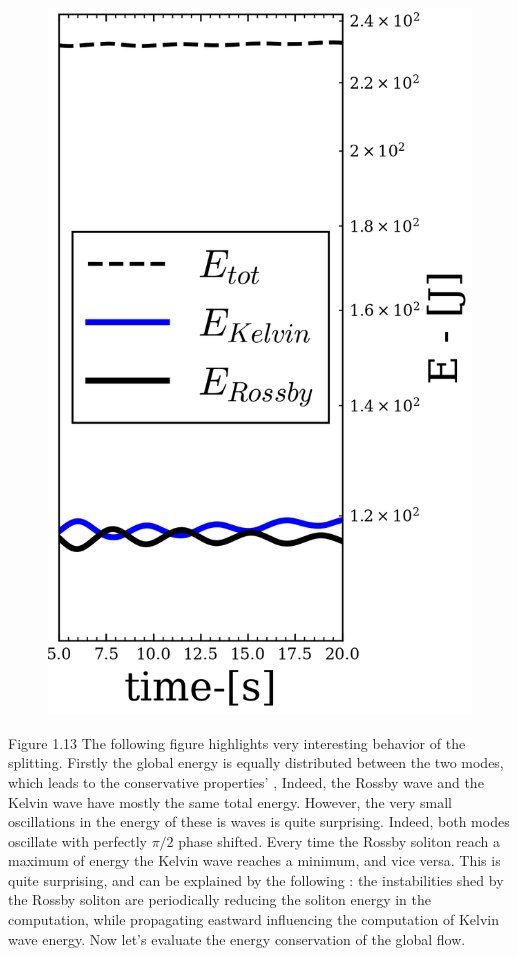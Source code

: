 \documentclass[11pt,a4paper]{report}
\begin{document}
\begin{multicols}{2}
    \begin{figure}
        \hspace*{-0.2cm}\includegraphics[width=1.2\linewidth]{./figure/energy_repartition.png}
    \end{figure}
    Figure 1.13 The following figure highlights very interesting behavior of the splitting. Firstly the global energy is equally distributed between the two modes, which leads to the conservative properties' , 
    Indeed, the Rossby wave and the Kelvin wave have mostly the same total energy. However, the very small oscillations in the energy of these is waves is quite surprising.
    Indeed, both modes oscillate with perfectly $\pi / 2$ phase shifted. Every time the Rossby soliton reach a maximum of energy the Kelvin wave reaches a minimum, and vice versa. This is quite surprising, and can be explained by the following : the instabilities shed by the Rossby soliton are periodically reducing the soliton energy in the computation, while propagating eastward influencing the computation of Kelvin wave energy.
    Now let's evaluate the energy conservation of the global flow.
    \begin{figure}
        \caption{\phantom{a}}
    \end{figure}


\end{multicols}
\end{document}

